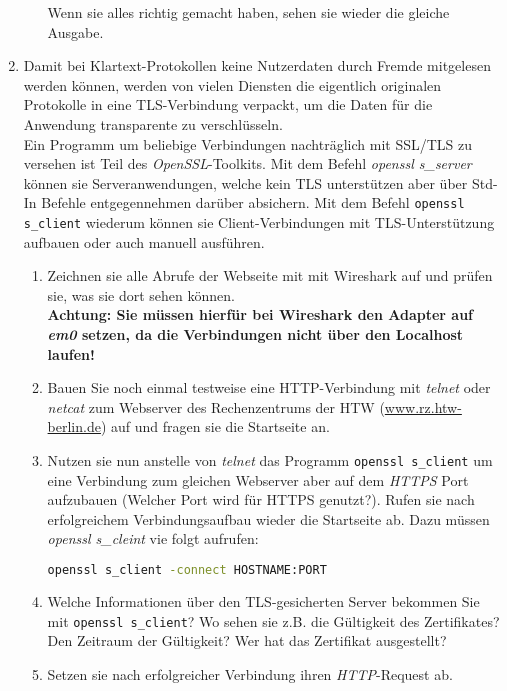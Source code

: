 \documentclass[paper=a4,fontsize=11pt]{scrartcl}%
\numberwithin{equation}{section}
\begin{document}
\begin{enumerate}
\begin{enumerate}
 Wenn sie alles richtig gemacht haben, sehen sie wieder die gleiche Ausgabe.
	\end{enumerate}
	\item Damit bei Klartext-Protokollen keine Nutzerdaten durch Fremde mitgelesen werden können, werden von vielen Diensten die eigentlich originalen Protokolle in eine TLS-Verbindung verpackt, um die Daten für die Anwendung transparente zu verschlüsseln.\\
Ein Programm um beliebige Verbindungen nachträglich mit SSL/TLS zu versehen ist Teil des \emph{OpenSSL}-Toolkits. Mit dem Befehl \emph{openssl s\_server} können sie Serveranwendungen, welche kein TLS unterstützen aber über Std-In Befehle entgegennehmen darüber absichern. Mit dem Befehl \texttt{openssl s\_client} wiederum können sie Client-Verbindungen mit TLS-Unterstützung aufbauen oder auch manuell ausführen.
	\begin{enumerate}
		\item Zeichnen sie alle Abrufe der Webseite mit mit Wireshark auf und prüfen sie, was sie dort sehen können.\\ \textbf{Achtung: Sie müssen hierfür bei Wireshark den Adapter auf \emph{em0} setzen, da die Verbindungen nicht über den Localhost laufen!}
		\item Bauen Sie noch einmal testweise eine HTTP-Verbindung mit \emph{telnet} oder \emph{netcat} zum Webserver des Rechenzentrums der HTW (\url{www.rz.htw-berlin.de}) auf und fragen sie die Startseite an.
 		\item Nutzen sie nun anstelle von \emph{telnet} das Programm \texttt{openssl s\_client} um eine Verbindung zum gleichen Webserver aber auf dem \emph{HTTPS} Port aufzubauen (Welcher Port wird für HTTPS genutzt?). Rufen sie nach erfolgreichem Verbindungsaufbau wieder die Startseite ab. Dazu müssen \emph{openssl s\_cleint} vie folgt aufrufen:
 		\begin{lstlisting}[style=Bash, language=Bash]
openssl s_client -connect HOSTNAME:PORT
\end{lstlisting}
 		\item Welche Informationen über den TLS-gesicherten Server bekommen Sie mit \texttt{openssl s\_client}? Wo sehen sie z.B. die Gültigkeit des Zertifikates? Den Zeitraum der Gültigkeit? Wer hat das Zertifikat ausgestellt?
 		\item Setzen sie nach erfolgreicher Verbindung ihren \emph{HTTP}-Request ab.
	\end{enumerate}
\end{enumerate}
\end{document}
